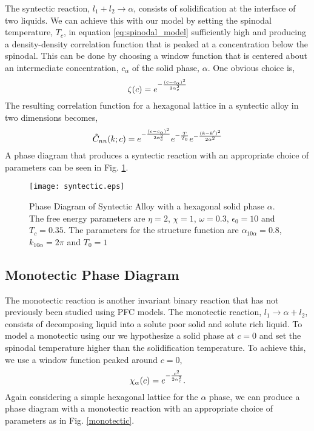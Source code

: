 The syntectic reaction, $l_1 + l_2 \rightarrow \alpha $, consists of
solidification at the interface of two liquids. We can achieve this with our
model by setting the spinodal temperature, $T_c$, in equation
\ref{eq:spinodal_model} sufficiently high and producing a density-density
correlation function that is peaked at a concentration below the spinodal. This
can be done by choosing  a window 
function that is centered about an intermediate concentration, $c_\alpha$ of 
the solid phase, $\alpha$. One obvious choice is, 
%
\begin{equation}
  \zeta(c) = e^{- \frac{(c - c_\alpha)^2}{2 \alpha_c^2}}
\end{equation}
%
The resulting correlation function for a hexagonal lattice in a syntectic alloy
 in two dimensions becomes, 
\begin{equation}
  \tilde{C}_{nn}(k; c) = 
    e^{-\frac{(c - c_\alpha)^2}{2 \alpha_c^2}}
    e^{-\frac{T}{T_0}} 
    e^{-\frac{(k - k^\prime)^2}{2\alpha^2}}
\end{equation}
%
A phase diagram that produces a syntectic reaction with an appropriate choice
of parameters can be seen in Fig. \ref{syntectic}. 

\begin{figure}
    \centering
	\texttt{[image: syntectic.eps]}
    \caption[Syntectic Phase Diagram]{
        \label{syntectic} Phase Diagram of Syntectic Alloy with a hexagonal
        solid phase $\alpha$. The free energy parameters are $\eta=2$, $\chi=1$,
        $\omega=0.3$, $\epsilon_0 = 10$ and $T_c=0.35$. The parameters for the
        structure function are $\alpha_{10\alpha} = 0.8$, $k_{10\alpha} = 2\pi$
        and $T_0 = 1$
    }
\end{figure}

\subsection{Monotectic Phase Diagram} %

The monotectic reaction is another invariant binary reaction that has not
previously been studied using PFC models. The monotectic reaction, $l_1
\rightarrow \alpha + l_2$, consists of decomposing liquid into a solute poor
solid and solute rich liquid. To model a monotectic using our  we hypothesize a solid phase at $c=0$ and set the spinodal temperature higher
than the solidification temperature. To achieve this, we use a window function
peaked around $c = 0$,
%
\begin{equation}
    \chi_\alpha(c) = e^{-\frac{c^2}{2\alpha_c^2}}.
\end{equation}
%
Again considering a simple hexagonal lattice for the $\alpha$ phase, we can
produce a phase diagram with a monotectic reaction with an appropriate choice
of parameters as in Fig. \ref{monotectic}.

